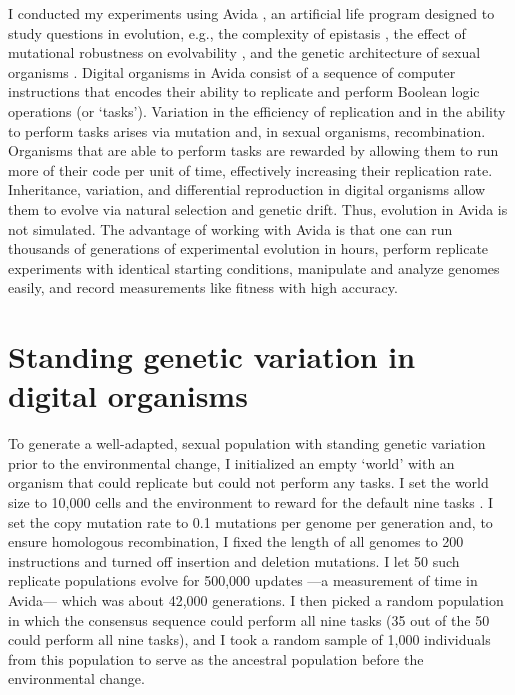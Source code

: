 \begin{doublespace}
I conducted my experiments using Avida \citep{ofr04},
an artificial life program designed to study questions in evolution,
e.g., the complexity of epistasis \citep{len99},
the effect of mutational robustness on evolvability \citep{ele08},
and the genetic architecture of sexual organisms \citep{mis06}.
%
Digital organisms in Avida
consist of a sequence of computer instructions
that encodes their ability to replicate
and perform Boolean logic operations (or `tasks').
%
Variation in the efficiency of replication and in the ability
to perform tasks arises via mutation and,
in sexual organisms, recombination.
%
Organisms that are able to perform tasks
are rewarded by allowing them to run
more of their code per unit of time,
effectively increasing their replication rate.
%
Inheritance, variation, and differential reproduction
in digital organisms allow them to evolve
via natural selection and genetic drift.
%
Thus, evolution in Avida is not simulated.
%
The advantage of working with Avida is that one can
run thousands of generations of experimental evolution in hours,
perform replicate experiments with identical starting conditions,
manipulate and analyze genomes easily, and
record measurements like fitness with high accuracy.





\section{Standing genetic variation in digital organisms}



To generate a well-adapted, sexual population
with standing genetic variation prior to the environmental change,
I initialized an empty `world' with an organism
that could replicate but could not perform any tasks.
%
I set the world size to 10,000 cells
and the environment to reward for
the default nine tasks \citep{len99}.
%
I set the copy mutation rate to 0.1 mutations
per genome per generation and,
to ensure homologous recombination,
I fixed the length of all genomes to 200 instructions
and turned off insertion and deletion mutations.
%
I let 50 such replicate populations evolve
for 500,000 updates%
---a measurement of time in Avida---%
which was about 42,000 generations.
%
I then picked a random population in which
the consensus sequence could perform all nine tasks
(35 out of the 50 could perform all nine tasks),
and I took a random sample of 1,000 individuals
from this population to serve as
the ancestral population before the environmental change.




\end{doublespace}
